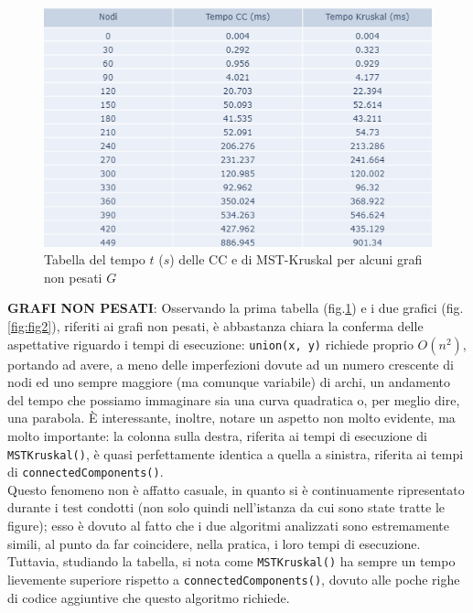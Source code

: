 \documentclass[]{article}
\def\code#1{\texttt{#1}} %
\begin{document}
\begin{figure}[!h]
\centering
\includegraphics[width=\textwidth]{tabella_GrafiNONPesati}
\caption{Tabella del tempo $t$ ($s$) delle CC e di MST-Kruskal per alcuni grafi non pesati $G$}
\label{fig:fig1}
\end{figure}

{\bf GRAFI NON PESATI}: Osservando la prima tabella (fig.\ref{fig:fig1}) e i due grafici (fig.\ref{fig:fig2}), riferiti ai grafi non pesati, è abbastanza chiara la conferma delle aspettative riguardo i tempi di esecuzione: \code{union(x, y)} richiede proprio $O(n^2)$, portando ad avere, a meno delle imperfezioni dovute ad un numero crescente di nodi ed uno sempre maggiore (ma comunque variabile) di archi, un andamento del tempo che possiamo immaginare sia una curva quadratica o, per meglio dire, una parabola. È interessante, inoltre, notare un aspetto non molto evidente, ma molto importante: la colonna sulla destra, riferita ai tempi di esecuzione di \code{MSTKruskal()}, è quasi perfettamente identica a quella a sinistra, riferita ai tempi di \code{connectedComponents()}. \\
Questo fenomeno non è affatto casuale, in quanto si è continuamente ripresentato durante i test condotti (non solo quindi nell'istanza da cui sono state tratte le figure); esso è dovuto al fatto che i due algoritmi analizzati sono estremamente simili, al punto da far coincidere, nella pratica, i loro tempi di esecuzione. Tuttavia, studiando la tabella, si nota come \code{MSTKruskal()} ha sempre un tempo lievemente superiore rispetto a \code{connectedComponents()}, dovuto alle poche righe di codice aggiuntive che questo algoritmo richiede.\\
\end{document}

